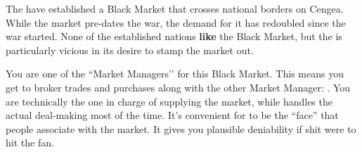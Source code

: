 \documentclass[green]{GL2020}
\begin{document}
\name{\gBMSupply{}}

The \pGoaties{} have established a Black Market that crosses national borders on Cengea. While the market pre-dates the war, the demand for it has redoubled since the war started. None of the established nations \textbf{like} the Black Market, but the \pTech{} is particularly vicious in its desire to stamp the market out.

You are one of the ``Market Managers’’ for this Black Market. This means you get to broker trades and purchases along with the other Market Manager: \cChupSecond{\full}. You are technically the one in charge of supplying the market, while \cChupSecond{} handles the actual deal-making most of the time. It’s convenient for \cChupSecond{} to be the ``face'' that people associate with the market. It gives you plausible deniability if shit were to hit the fan.
\end{document}
